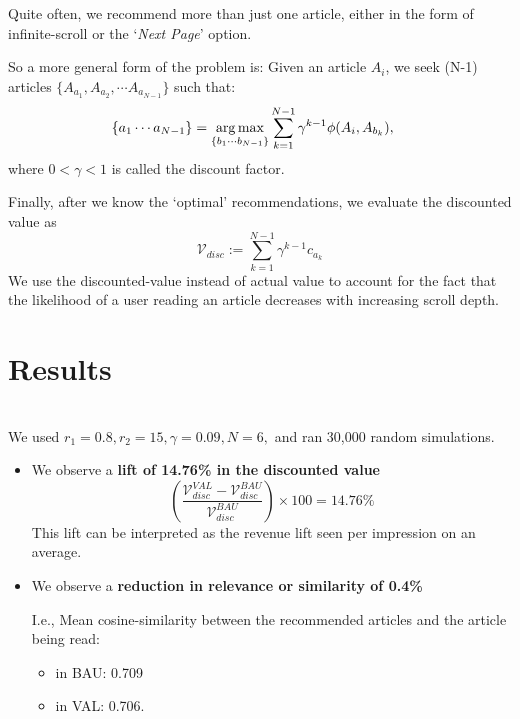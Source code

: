 \documentclass[11]{article}
\begin{document}

Quite often, we recommend more than just one article, either in the form of infinite-scroll or the `\textit{Next Page}' option.

So a more general form of the problem is:
Given an article $A_i$, we seek (N-1) articles $\{A_{a_1}, A_{a_2}, \cdots A_{a_{N-1}}\}$ such that:
\begin{align*}
\{a_1 \cdots a_{N-1}\} &= \operatorname*{arg\,max}_{\{b_1\cdots b_{{N-1}}\}}  \sum_{k=1}^{N-1}  \gamma^{k-1} \phi(A_i, A_{b_k}),
\end{align*}
where $0<\gamma<1$ is called the discount factor.

Finally, after we know the `optimal' recommendations, we evaluate the discounted value as \[\mathcal{V}_{disc}:=\sum_{k=1}^{N-1}  \gamma^{k-1} c_{a_k} \]
We use the discounted-value instead of actual value to account for the fact that the likelihood of a user reading an article decreases with increasing scroll depth.

\section{Results}

\\
We used $r_1=0.8, r_2=15, \gamma=0.09, N=6,$ and ran 30,000 random simulations.
\begin{itemize}
\item We observe a {\textbf{lift of 14.76\% in the discounted value}}
\[ \left( \dfrac{  \mathcal{V}^{VAL}_{disc}-\mathcal{V}^{BAU}_{disc}  }{\mathcal{V}^{BAU}_{disc} } \right) \times 100  =14.76\% \]
This lift can be interpreted as the revenue lift seen per impression on an average.
\item We observe a {\textbf{reduction in relevance or similarity  of 0.4\%}}

I.e., Mean cosine-similarity between the recommended articles and the article being read:
\begin{itemize}
\item in BAU: 0.709
\item in VAL: 0.706.
\end{itemize}
\end{itemize}

\end{document}
